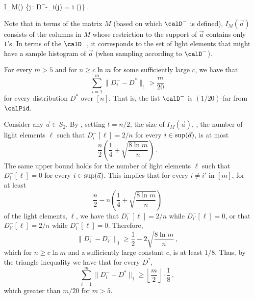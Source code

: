 \BEQ
I_M() \eqdef \left\{j\,:\; D^-_i(j) = 
   \;\;\;\forall i ()\right\}\,.
\label{I-veca-def.eq}
\EEQ




Note that in terms of the matrix $M$ (based on which $\calD^-$ is defined),
$I_M(\vec{a})$ consists of the columns in $M$ whose restriction to the support
of $\vec{a}$ contains only $1$'s. In terms of the $\calD^-$, it corresponds to the set of light elements that might have a sample histogram of $\vec{a}$ (when sampling according to $\calD^-$).

%







%

%

\begin{lemma} \label{far.lem}
For every $m > 5$ and for
%
$n\geq c\ln m$ for some sufficiently large $c$,
we have that 
\[
\sum_{i=1}^m \|D^-_i - D^*\|_1 > \frac{m}{20}
\]
for every
distribution $D^*$ over $[n]$.
That is, the list $\calD^-$ is $(1/20)$-far from $\calPid$.
\end{lemma}

%

%
\def\FarLemPrf{
Consider any $\vec{a}\in S_2$. By \expref{Lemma}{NOT.lem}, setting $t=n/2$,
the size of $I_M(\vec{a})$, \ie, the number of light elements $\ell$
such that $D^-_i[\ell] = {2}/{n}$ for every $i\in {\rm sup}(\vec{a})$, is at most
%
\[
\frac{n}{2}\left(\frac{1}{4} + \sqrt{\frac{8 \ln m}{n}}\right)\,.
\]
The same upper bound
holds for the number of light elements $\ell$
such that $D^-_{i}[\ell] = 0$ for every $i\in {\rm sup}(\vec{a})$.
This implies that for every $i\neq i'$ in $[m]$,
for at least
%
\[
\frac{n}{2} - n\left(\frac{1}{4} + \sqrt{\frac{8 \ln m}{n}}\right)
\]
of the light elements, $\ell$,
we have that $D^-_i[\ell] = {2}/{n}$ while $D^-_{i'}[\ell] = 0$,
or that $D^-_{i'}[\ell] = {2}/{n}$ while $D^-_{i}[\ell] = 0$.
Therefore,
%
%
%
\[
\|D^-_i - D^-_{i'}\|_1 \geq \frac{1}{2} -2\sqrt{\frac{8\ln m}{n}}\,,
\]
 which for $n \geq c\ln m$ and a sufficiently large constant $c$,
is at least ${1}/{8}$. Thus, by the triangle inequality we have that
for every $D^*$,
\[
\sum_{i=1}^m \|D^-_i - D^*\|_1 \geq \left\lfloor{\frac{m}{2}}\right\rfloor\cdot
\frac{1}{8}\,,
\] which greater than $m/20$ for $m>5$.
}
%

\BPF
\FarLemPrf
\EPF
\medskip

%

